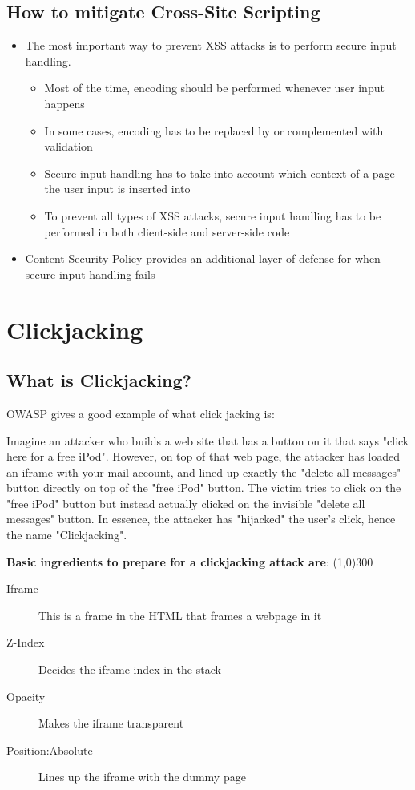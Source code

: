 \documentclass[a4paper, titlepage]{article}
\begin{document}
\subsection{How to mitigate Cross-Site Scripting}
\begin{itemize}
    \item The most important way to prevent XSS attacks is to perform secure input handling.
        \begin{itemize}
            \item Most of the time, encoding should be performed whenever user input happens
            \item In some cases, encoding has to be replaced by or complemented with validation
            \item Secure input handling has to take into account which context of a page the user input is inserted into
            \item To prevent all types of XSS attacks, secure input handling has to be performed in both client-side and server-side code
        \end{itemize}
    \item Content Security Policy provides an additional layer of defense for when secure input handling fails
\end{itemize}
\newpage

\section{Clickjacking}
\subsection{What is Clickjacking?}
OWASP gives a good example of what click jacking is:

Imagine an attacker who builds a web site that has a button on it that says "click here for a free iPod". However, on top of that web page, the attacker has loaded an iframe with your mail account, and lined up exactly the "delete all messages" button directly on top of the "free iPod" button. The victim tries to click on the "free iPod" button but instead actually clicked on the invisible "delete all messages" button. In essence, the attacker has "hijacked" the user's click, hence the name "Clickjacking".  \newline
\begin{center}
\textbf{Basic ingredients to prepare for a clickjacking attack are}: \newline
\line(1,0){300} \\

\begin{description}
    \item[Iframe] This is a frame in the HTML that frames a webpage in it
    \item[Z-Index] Decides the iframe index in the stack
    \item[Opacity] Makes the iframe transparent
    \item[Position:Absolute] Lines up the iframe with the dummy page
\end{description}
\end{center}
\end{document}
